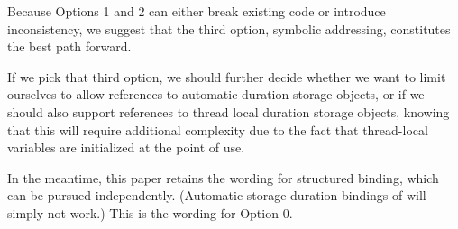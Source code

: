 \documentclass{wg21}
\begin{document}
Because Options 1 and 2 can either break existing code or introduce inconsistency, we suggest that the third option, symbolic addressing,
constitutes the best path forward.

If we pick that third option, we should further decide whether we want to limit ourselves to allow  references to automatic duration storage objects, or if we should also support
 references to thread local duration storage objects, knowing that this will require additional complexity due
to the fact that thread-local variables are initialized at the point of use.

In the meantime, this paper retains the wording for  structured binding, which can be pursued independently. (Automatic storage duration bindings of  will simply not work.) This is the wording for Option 0.
%
%
%
%
%
%
%
%
%
\end{document}
